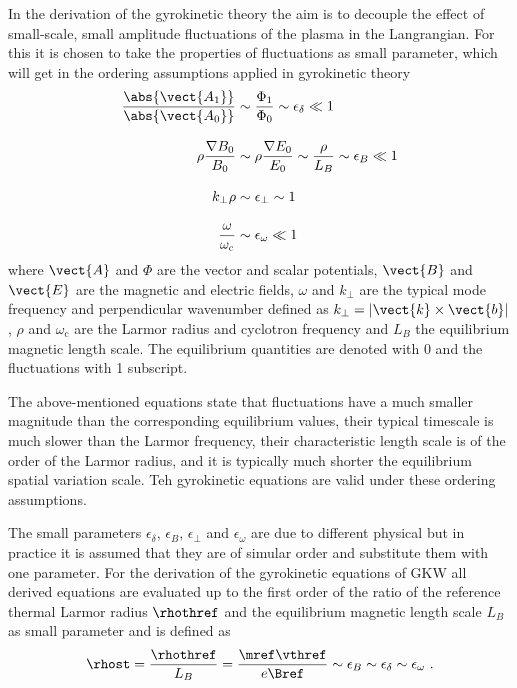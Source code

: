 In the derivation of the gyrokinetic theory the aim is to decouple the effect of small-scale, small amplitude fluctuations of the plasma in the Langrangian. For this it is chosen to take the properties of fluctuations as small parameter, which will get in the ordering assumptions applied in gyrokinetic theory \cite{Brizard2007}
\begin{gather}
	\begin{aligned}
		\frac{\abs{\vect{A_1}}}{\abs{\vect{A_0}}} &\sim \frac{\Phi_1}{\Phi_0} \sim \epsilon_\delta \ll 1 \\[0.3cm]
		\rho \frac{\nabla B_0}{B_0} &\sim \rho \frac{\nabla E_0}{E_0} \sim \frac{\rho}{L_B} \sim \epsilon_B \ll 1 \\[0.3cm]
		k_\perp \rho &\sim \epsilon_\perp \sim 1 \\[0.3cm]
		\frac{\omega}{\omega_\mathrm{c}} &\sim \epsilon_\omega \ll 1
	\end{aligned}
	\label{eq:gyroordering}
\end{gather}
where $\vect{A}$ and $\Phi$ are the vector and scalar potentials, $\vect{B}$ and $\vect{E}$ are the magnetic and electric fields, $\omega$ and $k_\perp$ are the typical mode frequency and perpendicular wavenumber defined as $k_\perp = |\vect{k} \times \vect{b}|$, $\rho$ and $\omega_\mathrm{c}$ are the Larmor radius and cyclotron frequency and $L_B$ the equilibrium magnetic length scale. The equilibrium quantities are denoted with 0 and the fluctuations with 1 subscript. \bigskip

The above-mentioned equations state that fluctuations have a much smaller magnitude than the corresponding equilibrium values, their typical timescale is much slower than the Larmor frequency, their characteristic length scale is of the order of the Larmor radius, and it is typically much shorter the equilibrium spatial variation scale. Teh gyrokinetic equations are valid under these ordering assumptions. \bigskip

The small parameters $\epsilon_\delta$, $\epsilon_B$, $\epsilon_\perp$ and $\epsilon_\omega$ are due to different physical but in practice it is assumed that they are of simular order and substitute them with one parameter. For the derivation of the gyrokinetic equations of GKW all derived equations are evaluated up to the first order of the ratio of the reference thermal Larmor radius $\rhothref$ and the equilibrium magnetic length scale $L_B$ as small parameter and is defined as \cite{Derivation}
\begin{gather}
	\rhost = \frac{\rhothref}{L_B} = \frac{\mref \vthref}{e \Bref} \sim \epsilon_B \sim \epsilon_\delta \sim \epsilon_\omega~.
	\label{eq:rhostar}
\end{gather}